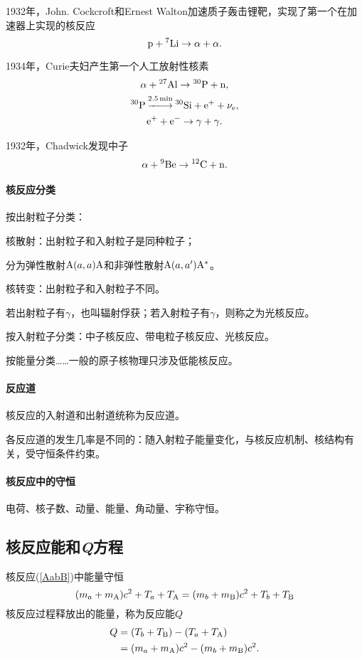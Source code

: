1932年，John. Cockcroft和Ernest Walton加速质子轰击锂靶，实现了第一个在加速器上实现的核反应
\[
	\mathrm p+{^{7}\mathrm{Li}}\to\alpha+\alpha.
\]

1934年，Curie夫妇产生第一个人工放射性核素
\begin{gather*}
	\alpha+{^{27}\mathrm{Al}}\to{^{30}\mathrm{P}}+\mathrm n,\\
	{^{30}\mathrm{P}}\overset{\SI{2.5}{min}}{-\hspace{-4 pt}-\hspace{-5 pt}\longrightarrow}{^{30}\mathrm{Si}}+\mathrm e^++\nu_\mathrm e,\\
	\mathrm e^++\mathrm e^-\to\gamma+\gamma.
\end{gather*}

1932年，Chadwick发现中子
\[
	\alpha+{^{9}\mathrm{Be}}\to{^{12}\mathrm{C}}+\mathrm n.
\]
\paragraph{核反应分类}
按出射粒子分类：
\begin{compactitem}
	\item 核散射：出射粒子和入射粒子是同种粒子；
	
	分为弹性散射${\mathrm{A}}(a,a){\mathrm{A}}$和非弹性散射${\mathrm{A}}(a,a'){\mathrm{A}^\ast}$。
	\item 核转变：出射粒子和入射粒子不同。
	
	若出射粒子有$\gamma$，也叫辐射俘获；若入射粒子有$\gamma$，则称之为光核反应。
\end{compactitem}
按入射粒子分类：中子核反应、带电粒子核反应、光核反应。

按能量分类……一般的原子核物理只涉及低能核反应。
\paragraph{反应道}核反应的入射道和出射道统称为反应道。

各反应道的发生几率是不同的：随入射粒子能量变化，与核反应机制、核结构有关，受守恒条件约束。

\paragraph{核反应中的守恒}电荷、核子数、动量、能量、角动量、宇称守恒。
\subsection{核反应能和\textit{Q}方程}
核反应(\ref{AabB})中能量守恒
\[
	(m_a+m_{\mathrm{A}})c^2+T_a+T_{\mathrm{A}}=(m_b+m_{\mathrm{B}})c^2+T_b+T_{\mathrm{B}}
\]
核反应过程释放出的能量，称为反应能$Q$
\begin{align}\notag
	Q&=(T_b+T_{\mathrm{B}})-(T_a+T_{\mathrm{A}})\\
	&=(m_a+m_{\mathrm{A}})c^2-(m_b+m_{\mathrm{B}})c^2.
\end{align}
